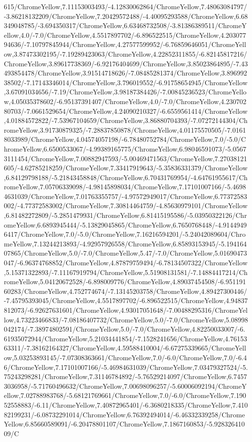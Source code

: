 {\begin{tikzternal}
{615/ChromeYellow,7.11153003493/-4.12830062864/ChromeYellow,7.48063084797/-3.86218132209/ChromeYellow,7.20429572488/-4.40095293588/ChromeYellow,6.68349048785/-3.694350317/ChromeYellow,6.63468732508/-3.81386389511/ChromeYellow,4.0/-7.0/ChromeYellow,4.5517897702/-6.896522515/ChromeYellow,4.20307794636/-7.10797845944/ChromeYellow,4.27577599952/-6.76859646051/ChromeYellow,3.87473302195/-7.19289423063/ChromeYellow,4.22852311855/-6.82145817216/ChromeYellow,3.89617738369/-6.92176404699/ChromeYellow,3.85023864895/-7.43493854478/ChromeYellow,3.91514718626/-7.08485281374/ChromeYellow,3.89699238502/-7.17143346014/ChromeYellow,3.796019552/-6.91758654945/ChromeYellow,3.67091034656/-7.19/ChromeYellow,3.98187384426/-7.00845236523/ChromeYellow,4.05035378602/-6.95137391407/ChromeYellow,4.0/-7.0/ChromeYellow,4.23070280703/-7.0661529654/ChromeYellow,4.24090210327/-6.6559561414/ChromeYellow,4.01884572822/-7.53967104659/ChromeYellow,3.86880704393/-7.07272144304/ChromeYellow,3.91730879325/-7.28837850878/ChromeYellow,4.01175570505/-7.01618033989/ChromeYellow,4.04574057198/-6.78480752784/ChromeYellow,7.0/-5.0/ChromeYellow,6.6500533067/-4.99389165775/ChromeYellow,6.98046591073/-5.05673111454/ChromeYellow,7.00882947593/-5.00469471563/ChromeYellow,7.27038121605/-4.62785218259/ChromeYellow,7.33417919643/-5.35836331379/ChromeYellow,6.84129798188/-5.21843458848/ChromeYellow,6.70431769954/-4.64761955617/ChromeYellow,7.05706339098/-4.98145898034/ChromeYellow,7.17101007166/-5.46984631039/ChromeYellow,7.01763355757/-4.97572949017/ChromeYellow,6.77372583002/-4.77372583002/ChromeYellow,7.30814464759/-4.85630979101/ChromeYellow,6.81482272809/-5.2851479931/ChromeYellow,6.81415195586/-5.03950322126/ChromeYellow,6.6893945444/-5.13829045865/ChromeYellow,6.7650768448/-4.91449496417/ChromeYellow,7.0/-5.0/ChromeYellow,7.16216594201/-5.24042089604/ChromeYellow,7.13244213893/-4.92957926558/ChromeYellow,6.85893153945/-5.19416407865/ChromeYellow,5.0/-7.0/ChromeYellow,5.47/-7.0/ChromeYellow,5.01690473047/-6.96374768852/ChromeYellow,4.87879759494/-6.78134507322/ChromeYellow,5.15371322893/-7.11167919794/ChromeYellow,5.51908131581/-7.14884417214/ChromeYellow,5.04120672528/-6.898009776/ChromeYellow,4.89037454508/-6.95119160283/ChromeYellow,4.752774674/-7.13145203758/ChromeYellow,4.89427300446/-7.45795393045/ChromeYellow,4.5517897702/-6.896522515/ChromeYellow,4.94837812073/-6.92627631601/ChromeYellow,4.93017051648/-7.00488295316/ChromeYellow,4.73223466833/-7.08186407732/ChromeYellow,5.0/-7.0/ChromeYellow,5.08998042174/-7.38974802591/ChromeYellow,5.0/-7.0/ChromeYellow,4.82250033007/-6.61935072944/ChromeYellow,5.21034441854/-7.1528241656/ChromeYellow,4.7615363311/-7.38162164327/ChromeYellow,4.59588410004/-6.67275339665/ChromeYellow,5.03253893145/-7.07308363661/ChromeYellow,7.0/-6.0/ChromeYellow,7.0/-6.46/ChromeYellow,7.17101007166/-5.46984631039/ChromeYellow,7.03479327524/-5.75243298281/ChromeYellow,7.31146784892/-5.76529214097/ChromeYellow,6.74573036958/-5.71760496632/ChromeYellow,7.00698096257/-5.60006092194/ChromeYellow,7.02788983768/-5.68121769661/ChromeYellow,7.0/-6.0/ChromeYellow,7.19052558883/-6.11/ChromeYellow,7.40872965401/-6.3680218335/ChromeYellow,7.41082199231/-6.08732291014/ChromeYellow,6.76392494014/-6.46332339258/ChromeYellow,6.85660589091/-6.20478801107/ChromeYellow,7.1867160853/-5.92832641009/C}
\end{tikzternal}}
